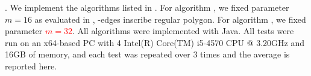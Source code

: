 





.
We implement the algorithms listed in .
For algorithm \cised, we fixed parameter $m=16$ as evaluated in \cite{Lin:Cised}, -edges inscribe regular polygon.
For algorithm \nopts, we fixed parameter \textcolor{red}{$m=32$}. 
All algorithms were implemented with Java.
All tests were run on an x64-based  PC with 4 Intel(R) Core(TM) i5-4570 CPU @ 3.20GHz  and 16GB of memory, and each test was repeated
over 3 times and the average is reported here.


